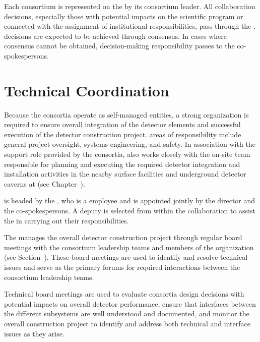 Each consortium is represented on the   by its 
consortium leader.  All collaboration decisions, especially those with potential 
impacts on the  scientific program or connected with the assignment 
of institutional responsibilities, pass through the .   
decisions are expected to be achieved through consensus.  In cases where consensus 
cannot be obtained, decision-making responsibility passes to the co-spokespersons.

\section{Technical Coordination}
\label{sec:tc}

Because the consortia operate as self-managed entities, a strong
 organization is required to ensure overall integration 
of the detector elements and successful execution of the detector
construction project.   areas of responsibility include 
general project oversight, systems engineering,  
and safety.  In association with the support role provided by 
the consortia,  also works closely with the on-site 
team responsible for planning and executing the required 
detector integration and installation activities in the nearby 
surface facilities and underground detector caverns at  
(see Chapter~\label{ch:tc-jpo}).  

 is headed by the , who is a 
employee and is appointed jointly by the  director and 
the  co-spokespersons.  A deputy  
is selected from within the collaboration to assist the  
in carrying out their responsibilities.

The  manages the overall detector construction project
through regular board meetings with the consortium leadership teams and 
members of the  organization (see Section~\label{sec:tco}).  
These board meetings are used to identify and resolve technical issues
and serve as the primary forums for required interactions between the 
consortium leadership teams.

Technical board meetings are used to evaluate consortia design
decisions with potential impacts on overall detector performance,
ensure that interfaces between the different subsystems are well
understood and documented, and monitor the overall construction
project to identify and address both technical and interface issues 
as they arise.

